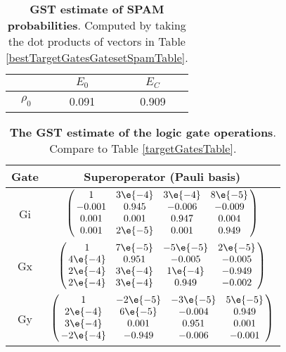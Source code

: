 {\begin{table}[h]
\begin{center}
\begin{tabular}[l]{|c|c|c|}
\hline
 & $E_{0}$ & $E_C$ \\ \hline
$\rho_{0}$ & 0.091 & 0.909 \\ \hline
\end{tabular}

\caption{\textbf{GST estimate of SPAM probabilities}.  Computed by taking the dot products of vectors in Table \ref{bestTargetGatesGatesetSpamTable}.\label{bestTargetGatesGatesetSpamParametersTable}}
\end{center}
\end{table}

\begin{table}[h]
\begin{center}
\begin{tabular}[l]{|c|c|}
\hline
Gate & Superoperator (Pauli basis) \\ \hline
Gi & $ \left(\!\!\begin{array}{cccc}
1 & 3\e{-4} & 3\e{-4} & 8\e{-5} \\ 
-0.001 & 0.945 & -0.006 & -0.009 \\ 
0.001 & 0.001 & 0.947 & 0.004 \\ 
0.001 & 2\e{-5} & 0.001 & 0.949
 \end{array}\!\!\right) $
 \\ \hline
Gx & $ \left(\!\!\begin{array}{cccc}
1 & 7\e{-5} & -5\e{-5} & 2\e{-5} \\ 
4\e{-4} & 0.951 & -0.005 & -0.005 \\ 
2\e{-4} & 3\e{-4} & 1\e{-4} & -0.949 \\ 
2\e{-4} & 3\e{-4} & 0.949 & -0.002
 \end{array}\!\!\right) $
 \\ \hline
Gy & $ \left(\!\!\begin{array}{cccc}
1 & -2\e{-5} & -3\e{-5} & 5\e{-5} \\ 
2\e{-4} & 6\e{-5} & -0.004 & 0.949 \\ 
3\e{-4} & 0.001 & 0.951 & 0.001 \\ 
-2\e{-4} & -0.949 & -0.006 & -0.001
 \end{array}\!\!\right) $
 \\ \hline
\end{tabular}

\caption{\textbf{The GST estimate of the logic gate operations}.  Compare to Table \ref{targetGatesTable}.\label{bestTargetGatesGatesetGatesTable}}
\end{center}
\end{table}

}
